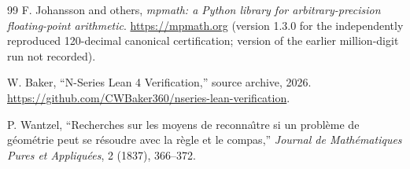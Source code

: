 \documentclass[12pt]{article}
\theoremstyle{definition}
\theoremstyle{remark}
\begin{document}
\begin{thebibliography}{99}
F. Johansson and others,
\textit{mpmath: a Python library for arbitrary-precision floating-point
arithmetic}.
\url{https://mpmath.org}
(version 1.3.0 for the independently reproduced 120-decimal canonical
certification; version of the earlier million-digit run not recorded).

W. Baker,
``N-Series Lean 4 Verification,''
source archive, 2026.
\url{https://github.com/CWBaker360/nseries-lean-verification}.

P. Wantzel,
``Recherches sur les moyens de reconna\^\i tre si un probl\`eme de g\'eom\'etrie
peut se r\'esoudre avec la r\`egle et le compas,''
\textit{Journal de Math\'ematiques Pures et Appliqu\'ees}, 2 (1837), 366--372.

\end{thebibliography}
\end{document}
